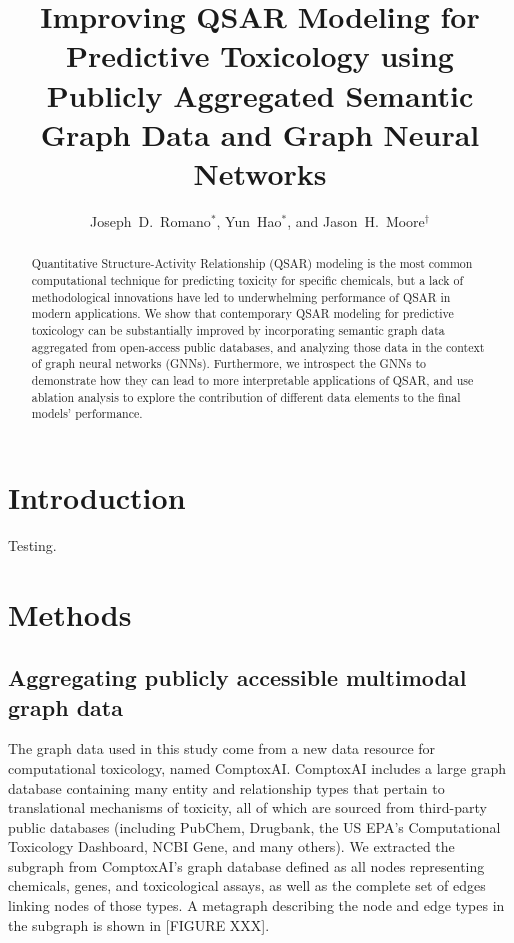 \documentclass{ws-procs11x85}
\begin{document}
\title{Improving QSAR Modeling for Predictive Toxicology using Publicly Aggregated Semantic Graph Data and Graph Neural Networks}

\author{Joseph~D.~Romano$^*$, Yun~Hao$^*$, and Jason~H.~Moore$^\dag$}

\address{Institute for Biomedical Informatics, University of Pennsylvania,\\
Philadelphia, Pennsylvania 19104, United States\\
$^\dag$E-mail: jhmoore@upenn.edu\\
$^*$These authors contributed equally.}

\begin{abstract}
Quantitative Structure-Activity Relationship (QSAR) modeling is the most common computational technique for predicting toxicity for specific chemicals, but a lack of methodological innovations have led to underwhelming performance of QSAR in modern applications.
We show that contemporary QSAR modeling for predictive toxicology can be substantially improved by incorporating semantic graph data aggregated from open-access public databases, and analyzing those data in the context of graph neural networks (GNNs).
Furthermore, we introspect the GNNs to demonstrate how they can lead to more interpretable applications of QSAR, and use ablation analysis to explore the contribution of different data elements to the final models' performance.
\end{abstract}


\section{Introduction}\label{aba:sec1}
Testing.

\section{Methods}

\subsection{Aggregating publicly accessible multimodal graph data}
The graph data used in this study come from a new data resource for computational toxicology, named ComptoxAI.
ComptoxAI includes a large graph database containing many entity and relationship types that pertain to translational mechanisms of toxicity, all of which are sourced from third-party public databases (including PubChem, Drugbank, the US EPA's Computational Toxicology Dashboard, NCBI Gene, and many others).
We extracted the subgraph from ComptoxAI's graph database defined as all nodes representing chemicals, genes, and toxicological assays, as well as the complete set of edges linking nodes of those types.
A metagraph describing the node and edge types in the subgraph is shown in [FIGURE XXX].
\end{document}
